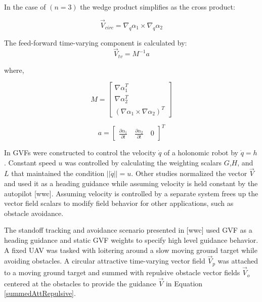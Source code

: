 \documentclass[numbered,pdftex]{ohio-etd}
\begin{document}
\noindent
In the case of $(n=3)$ the wedge product simplifies as the cross product:

\begin{equation}
\overrightarrow{V}_{circ} =  \nabla_q\alpha_1 \times \nabla_q\alpha_2 
\label{circOnlySimp}
\end{equation}

\noindent
The feed-forward time-varying component is calculated by:
\begin{equation}
\label{tv}
\overrightarrow{V}_{tv} = M^{-1}a
\end{equation}

\noindent
where,

\begin{equation}
\label{mMatrix}
M =\begin{bmatrix}
\nabla\alpha_1^T \\
\nabla\alpha_2^T \\
(\nabla\alpha_1 \times \nabla\alpha_2)^T
\end{bmatrix}
\end{equation}

\begin{equation}
\label{aVector}
a =\begin{bmatrix}
\frac{\partial \alpha_1}{\partial t} \quad   \frac{\partial \alpha_2}{\partial t} \quad   0
\end{bmatrix}^T
\end{equation}


In \cite{goncalves_artificial_2009,goncalves_circulation_2010,goncalves_vector_2010} GVFs were constructed to control the velocity $\dot{q}$ of a holonomic robot by $\dot{q}=h$. Constant speed  $u$ was controlled by calculating the weighting scalars $G$,$H$, and $L$ that maintained the condition $||\dot{q}|| = u$. Other studies normalized the vector $\overrightarrow{V}$ and used it as a heading guidance while assuming velocity is held constant by the autopilot \cite{gerlach_autonomous_2014}[wwc]. Assuming velocity is controlled by a separate system frees up the vector field scalars to modify field behavior for other applications, such as obstacle avoidance. 
 
 
 The standoff tracking and avoidance scenario presented in [wwc] used GVF as a heading guidance and static GVF weights to specify high level guidance behavior. A fixed UAV was tasked with loitering around a slow moving ground target while avoiding obstacles. A circular attractive time-varying vector field $\overrightarrow{V}_{p}$ was attached to a moving ground target and summed with repulsive obstacle vector fields $\overrightarrow{V}_{o}$ centered at the obstacles to provide the guidance $\overrightarrow{V}$ in Equation \ref{summedAttRepulsive}. 
 
\end{document}
